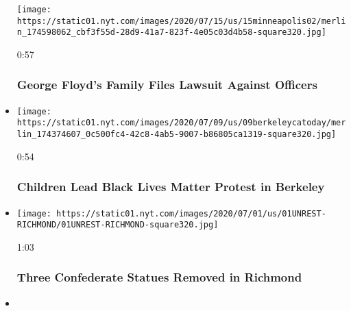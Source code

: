\begin{itemize}
  \texttt{[image: https://static01.nyt.com/images/2020/07/15/us/15minneapolis02/merlin\_174598062\_cbf3f55d-28d9-41a7-823f-4e05c03d4b58-square320.jpg]}

  0:57

  \hypertarget{george-floyds-family-files-lawsuit-against-officers}{%
  \subsubsection{George Floyd's Family Files Lawsuit Against
  Officers}\label{george-floyds-family-files-lawsuit-against-officers}}
\item
  \href{https://www.nytimes.com/video/us/100000007231853/children-lead-black-lives-matter-protest-in-berkeley.html?action=click\&module=video-series-bar\&region=header\&pgtype=Article\&playlistId=video/minneapolis-george-floyd-death-video}{}

  \texttt{[image: https://static01.nyt.com/images/2020/07/09/us/09berkeleycatoday/merlin\_174374607\_0c500fc4-42c8-4ab5-9007-b86805ca1319-square320.jpg]}

  0:54

  \hypertarget{children-lead-black-lives-matter-protest-in-berkeley}{%
  \subsubsection{Children Lead Black Lives Matter Protest in
  Berkeley}\label{children-lead-black-lives-matter-protest-in-berkeley}}
\item
  \href{https://www.nytimes.com/video/us/100000007227431/confederate-statues-removed-richmond.html?action=click\&module=video-series-bar\&region=header\&pgtype=Article\&playlistId=video/minneapolis-george-floyd-death-video}{}

  \texttt{[image: https://static01.nyt.com/images/2020/07/01/us/01UNREST-RICHMOND/01UNREST-RICHMOND-square320.jpg]}

  1:03

  \hypertarget{three-confederate-statues-removed-in-richmond}{%
  \subsubsection{Three Confederate Statues Removed in
  Richmond}\label{three-confederate-statues-removed-in-richmond}}
\item
  \href{https://www.nytimes.com/video/us/politics/100000007220241/richmond-confederate-monument-taken-down.html?action=click\&module=video-series-bar\&region=header\&pgtype=Article\&playlistId=video/minneapolis-george-floyd-death-video}{}


\end{itemize}
